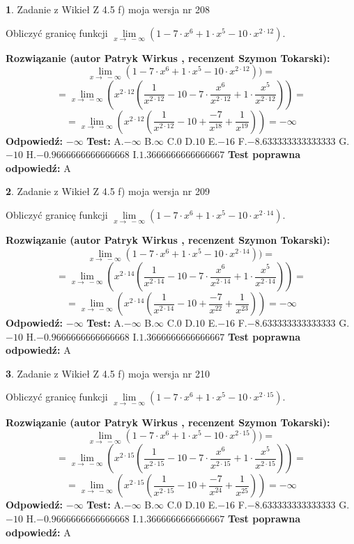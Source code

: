 \documentclass[12pt, a4paper]{article}
\theoremstyle{definition} %
\newtheorem{zad}{}
\newcommand{\zadStart}[1]{\begin{zad}#1\newline}
\newcommand{\zadStop}{\end{zad}}
\newcommand{\rozwStart}[2]{\noindent \textbf{Rozwiązanie (autor #1 , recenzent #2): }\newline}
\newcommand{\rozwStop}{\newline}
\newcommand{\odpStart}{\noindent \textbf{Odpowiedź:}\newline}
\newcommand{\odpStop}{\newline}
\newcommand{\testStart}{\noindent \textbf{Test:}\newline}
\newcommand{\testStop}{\newline}
\newcommand{\kluczStart}{\noindent \textbf{Test poprawna odpowiedź:}\newline}
\newcommand{\kluczStop}{\newline}
\begin{document}
\zadStart{Zadanie z Wikieł Z 4.5 f) moja wersja nr 208}


Obliczyć granicę funkcji  $\lim\limits_{x\to\ -\infty}(1 - 7 \cdot x^{6}+1 \cdot x^{5}- 10 \cdot x^{2\cdot12})$.
\zadStop
\rozwStart{Patryk Wirkus}{Szymon Tokarski}
$$\lim\limits_{x\to\ -\infty}(1 - 7 \cdot x^{6}+1 \cdot x^{5}- 10 \cdot x^{2\cdot12}))=$$
$$=\lim\limits_{x\to\ -\infty}(x^{2\cdot12}(\frac{1}{x^{2\cdot12}}-10 -7 \cdot \frac{x^{6}}{x^{2\cdot12}}+1 \cdot \frac{x^{5}}{x^{2\cdot12}}))=$$
$$=\lim\limits_{x\to\ -\infty}(x^{2\cdot12}(\frac{1}{x^{2\cdot12}}-10 + \frac{-7}{x^{18}}+ \frac{1}{x^{19}}))=-\infty$$
\rozwStop
\odpStart
$-\infty$
\odpStop
\testStart
A.$-\infty$ B.$\infty$ C.$0$ D.$10$ E.$-16$
F.$-8.633333333333333$ G.$-10$
H.$-0.9666666666666668$
I.$1.3666666666666667$
\testStop
\kluczStart
A
\kluczStop



\zadStart{Zadanie z Wikieł Z 4.5 f) moja wersja nr 209}


Obliczyć granicę funkcji  $\lim\limits_{x\to\ -\infty}(1 - 7 \cdot x^{6}+1 \cdot x^{5}- 10 \cdot x^{2\cdot14})$.
\zadStop
\rozwStart{Patryk Wirkus}{Szymon Tokarski}
$$\lim\limits_{x\to\ -\infty}(1 - 7 \cdot x^{6}+1 \cdot x^{5}- 10 \cdot x^{2\cdot14}))=$$
$$=\lim\limits_{x\to\ -\infty}(x^{2\cdot14}(\frac{1}{x^{2\cdot14}}-10 -7 \cdot \frac{x^{6}}{x^{2\cdot14}}+1 \cdot \frac{x^{5}}{x^{2\cdot14}}))=$$
$$=\lim\limits_{x\to\ -\infty}(x^{2\cdot14}(\frac{1}{x^{2\cdot14}}-10 + \frac{-7}{x^{22}}+ \frac{1}{x^{23}}))=-\infty$$
\rozwStop
\odpStart
$-\infty$
\odpStop
\testStart
A.$-\infty$ B.$\infty$ C.$0$ D.$10$ E.$-16$
F.$-8.633333333333333$ G.$-10$
H.$-0.9666666666666668$
I.$1.3666666666666667$
\testStop
\kluczStart
A
\kluczStop



\zadStart{Zadanie z Wikieł Z 4.5 f) moja wersja nr 210}


Obliczyć granicę funkcji  $\lim\limits_{x\to\ -\infty}(1 - 7 \cdot x^{6}+1 \cdot x^{5}- 10 \cdot x^{2\cdot15})$.
\zadStop
\rozwStart{Patryk Wirkus}{Szymon Tokarski}
$$\lim\limits_{x\to\ -\infty}(1 - 7 \cdot x^{6}+1 \cdot x^{5}- 10 \cdot x^{2\cdot15}))=$$
$$=\lim\limits_{x\to\ -\infty}(x^{2\cdot15}(\frac{1}{x^{2\cdot15}}-10 -7 \cdot \frac{x^{6}}{x^{2\cdot15}}+1 \cdot \frac{x^{5}}{x^{2\cdot15}}))=$$
$$=\lim\limits_{x\to\ -\infty}(x^{2\cdot15}(\frac{1}{x^{2\cdot15}}-10 + \frac{-7}{x^{24}}+ \frac{1}{x^{25}}))=-\infty$$
\rozwStop
\odpStart
$-\infty$
\odpStop
\testStart
A.$-\infty$ B.$\infty$ C.$0$ D.$10$ E.$-16$
F.$-8.633333333333333$ G.$-10$
H.$-0.9666666666666668$
I.$1.3666666666666667$
\testStop
\kluczStart
A
\kluczStop
\end{document}
